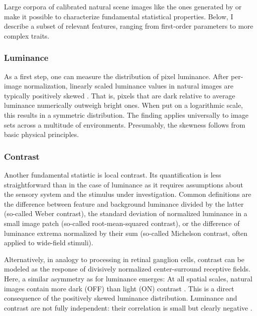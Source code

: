 Large corpora of calibrated natural scene images like the ones generated by \citet{vanHateren:1998jt} or \citet{Tkacik:2011aa} make it possible to characterize fundamental statistical properties. Below, I describe a subset of relevant features, ranging from first-order parameters to more complex traits.

\subsubsection{Luminance}

As a first step, one can measure the distribution of pixel luminance. After per-image normalization, linearly scaled luminance values in natural images are typically positively skewed \citep{Brady:2000aa,Laughlin:1981wn,Geisler:2008gu}. That is, pixels that are dark relative to average luminance numerically outweigh bright ones. When put on a logarithmic scale, this results in a symmetric distribution. The finding applies universally to image sets across a multitude of environments. Presumably, the skewness follows from basic physical principles.

\subsubsection{Contrast}
Another fundamental statistic is local contrast. Its quantification is less straightforward than in the case of luminance as it requires assumptions about the sensory system and the stimulus under investigation. Common definitions are the difference between feature and background luminance divided by the latter (so-called Weber contrast), the standard deviation of normalized luminance in a small image patch (so-called root-mean-squared contrast), or the difference of luminance extrema normalized by their sum (so-called Michelson contrast, often applied to wide-field stimuli).

Alternatively, in analogy to processing in retinal ganglion cells, contrast can be modeled as the response of divisively normalized center-surround receptive fields. Here, a similar asymmetry as for luminance emerges: At all spatial scales, natural images contain more dark (OFF) than light (ON) contrast \citep{Ratliff:2010kb,Cooper:2015in}. This is a direct consequence of the positively skewed luminance distribution. Luminance and contrast are not fully independent: their correlation is small but clearly negative \citep{Geisler:2008gu}.

